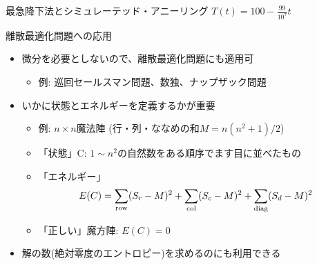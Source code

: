 \documentclass[dvipdfmx]{beamer}
\begin{document}
\begin{frame}[t,fragile]{最急降下法とシミュレーテッド・アニーリング}
  \hspace*{17em}$T(t) = 100 - \frac{99}{10^7} t$
\end{frame}

\begin{frame}[t,fragile]{離散最適化問題への応用}
  \begin{itemize}
    \setlength{\itemsep}{1em}
  \item 微分を必要としないので、離散最適化問題にも適用可
    \begin{itemize}
    \item 例: 巡回セールスマン問題、数独、ナップザック問題
    \end{itemize}
  \item いかに状態とエネルギーを定義するかが重要
    \begin{itemize}
    \item 例: $n \times n$魔法陣 (行・列・ななめの和$M = n(n^2+1)/2$)
    \item 「状態」C: $1\sim n^2$の自然数をある順序でます目に並べたもの
    \item 「エネルギー」
      \[
      E(C) = \sum_{\rm row} (S_r-M)^2 + \sum_{\rm col} (S_c-M)^2 + \sum_{\rm diag} (S_d-M)^2
      \]
    \item 「正しい」魔方陣: $E(C) = 0$
    \end{itemize}
  \item 解の数(絶対零度のエントロピー)を求めるのにも利用できる
  \end{itemize}
\end{frame}
\end{document}
